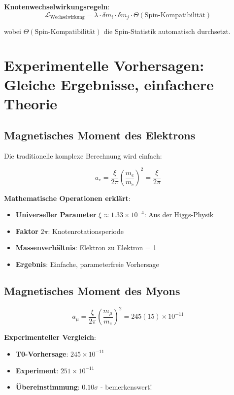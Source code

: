 \documentclass[12pt,a4paper]{article}
\newcommand{\Lag}{\mathcal{L}}
\newcommand{\deltam}{\delta m}
\newcommand{\xipar}{\xi}
\theoremstyle{definition}
\theoremstyle{remark}
\begin{document}
	\textbf{Knotenwechselwirkungsregeln}:
	\begin{equation}
		\Lag_{\text{Wechselwirkung}} = \lambda \cdot \deltam_i \cdot \deltam_j \cdot \Theta(\text{Spin-Kompatibilität})
		\label{eq:node_interactions}
	\end{equation}
	
	wobei $\Theta(\text{Spin-Kompatibilität})$ die Spin-Statistik automatisch durchsetzt.
	
	\section{Experimentelle Vorhersagen: Gleiche Ergebnisse, einfachere Theorie}
	
	\subsection{Magnetisches Moment des Elektrons}
	
	Die traditionelle komplexe Berechnung wird einfach:
	
	\begin{equation}
		a_e = \frac{\xipar}{2\pi} \left(\frac{m_e}{m_e}\right)^2 = \frac{\xipar}{2\pi}
		\label{eq:electron_g2_simple}
	\end{equation}
	
	\textbf{Mathematische Operationen erklärt}:
	\begin{itemize}
		\item \textbf{Universeller Parameter} $\xipar \approx 1.33 \times 10^{-4}$: Aus der Higgs-Physik
		\item \textbf{Faktor} $2\pi$: Knotenrotationsperiode
		\item \textbf{Massenverhältnis}: Elektron zu Elektron = 1
		\item \textbf{Ergebnis}: Einfache, parameterfreie Vorhersage
	\end{itemize}
	
	\subsection{Magnetisches Moment des Myons}
	
	\begin{equation}
		a_\mu = \frac{\xipar}{2\pi} \left(\frac{m_\mu}{m_e}\right)^2 = 245(15) \times 10^{-11}
		\label{eq:muon_g2_simple}
	\end{equation}
	
	\textbf{Experimenteller Vergleich}:
	\begin{itemize}
		\item \textbf{T0-Vorhersage}: $245 \times 10^{-11}$
		\item \textbf{Experiment}: $251 \times 10^{-11}$
		\item \textbf{Übereinstimmung}: $0.10\sigma$ - bemerkenswert!
	\end{itemize}
	
\end{document}

